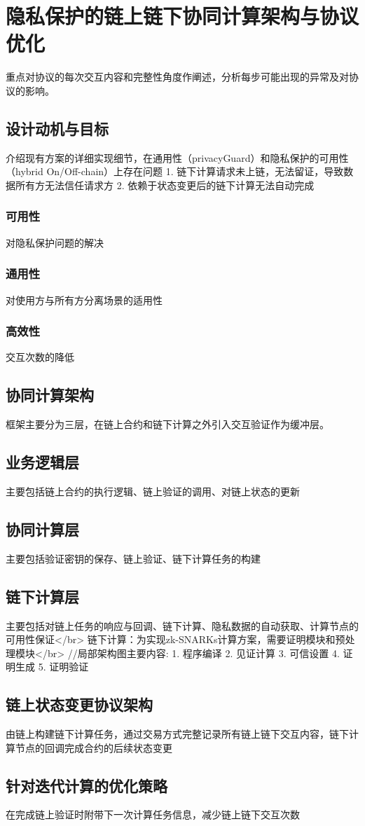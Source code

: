 \chapter{隐私保护的链上链下协同计算架构与协议优化}
重点对协议的每次交互内容和完整性角度作阐述，分析每步可能出现的异常及对协议的影响。
\section{设计动机与目标}
介绍现有方案的详细实现细节，在通用性（privacyGuard）和隐私保护的可用性（hybrid On/Off-chain）上存在问题
1. 链下计算请求未上链，无法留证，导致数据所有方无法信任请求方
2. 依赖于状态变更后的链下计算无法自动完成
\subsection{可用性}
对隐私保护问题的解决

\subsection{通用性}
对使用方与所有方分离场景的适用性

\subsection{高效性}
交互次数的降低

\section{协同计算架构}
框架主要分为三层，在链上合约和链下计算之外引入交互验证作为缓冲层。

\section{业务逻辑层}
主要包括链上合约的执行逻辑、链上验证的调用、对链上状态的更新

\section{协同计算层}
主要包括验证密钥的保存、链上验证、链下计算任务的构建

\section{链下计算层}
主要包括对链上任务的响应与回调、链下计算、隐私数据的自动获取、计算节点的可用性保证</br>
链下计算：为实现zk-SNARKs计算方案，需要证明模块和预处理模块</br>
//局部架构图主要内容:
1. 程序编译
2. 见证计算
3. 可信设置
4. 证明生成
5. 证明验证

\section{链上状态变更协议架构}
由链上构建链下计算任务，通过交易方式完整记录所有链上链下交互内容，链下计算节点的回调完成合约的后续状态变更

\section{针对迭代计算的优化策略}
在完成链上验证时附带下一次计算任务信息，减少链上链下交互次数
